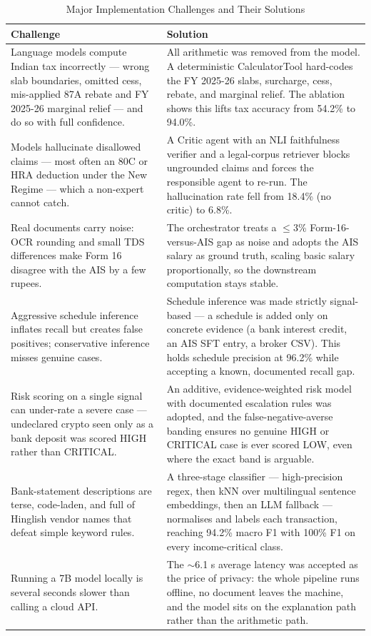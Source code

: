 \documentclass[12pt, a4paper, oneside]{report}
\begin{document}
\begin{table}[H]
\centering
\caption{Major Implementation Challenges and Their Solutions}
\label{tab:challenges}
\begin{tabularx}{\textwidth}{|X|X|}
\hline
\textbf{Challenge} & \textbf{Solution} \\
\hline
Language models compute Indian tax incorrectly --- wrong slab boundaries,
omitted cess, mis-applied 87A rebate and FY 2025-26 marginal relief --- and do
so with full confidence. & All arithmetic was removed from the model. A
deterministic CalculatorTool hard-codes the FY 2025-26 slabs, surcharge, cess,
rebate, and marginal relief. The ablation shows this lifts tax accuracy from
54.2\% to 94.0\%. \\
\hline
Models hallucinate disallowed claims --- most often an 80C or HRA deduction
under the New Regime --- which a non-expert cannot catch. & A Critic agent with
an NLI faithfulness verifier and a legal-corpus retriever blocks ungrounded
claims and forces the responsible agent to re-run. The hallucination rate fell
from 18.4\% (no critic) to 6.8\%. \\
\hline
Real documents carry noise: OCR rounding and small TDS differences make Form 16
disagree with the AIS by a few rupees. & The orchestrator treats a
$\leq$3\% Form-16-versus-AIS gap as noise and adopts the AIS salary as ground
truth, scaling basic salary proportionally, so the downstream computation stays
stable. \\
\hline
Aggressive schedule inference inflates recall but creates false positives;
conservative inference misses genuine cases. & Schedule inference was made
strictly signal-based --- a schedule is added only on concrete evidence (a bank
interest credit, an AIS SFT entry, a broker CSV). This holds schedule precision
at 96.2\% while accepting a known, documented recall gap. \\
\hline
Risk scoring on a single signal can under-rate a severe case --- undeclared
crypto seen only as a bank deposit was scored HIGH rather than CRITICAL. & An
additive, evidence-weighted risk model with documented escalation rules was
adopted, and the false-negative-averse banding ensures no genuine HIGH or
CRITICAL case is ever scored LOW, even where the exact band is arguable. \\
\hline
Bank-statement descriptions are terse, code-laden, and full of Hinglish vendor
names that defeat simple keyword rules. & A three-stage classifier ---
high-precision regex, then kNN over multilingual sentence embeddings, then an
LLM fallback --- normalises and labels each transaction, reaching 94.2\% macro
F1 with 100\% F1 on every income-critical class. \\
\hline
Running a 7B model locally is several seconds slower than calling a cloud API. &
The $\sim$6.1 s average latency was accepted as the price of privacy: the whole
pipeline runs offline, no document leaves the machine, and the model sits on the
explanation path rather than the arithmetic path. \\
\hline
\end{tabularx}
\end{table}
\end{document}
